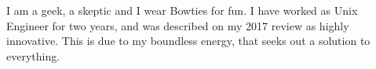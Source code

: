 

\begin{cvparagraph}
I am a geek, a skeptic and I wear Bowties for fun.
I have worked as Unix Engineer for two years, and was described on my 2017 review as  highly innovative.
This is due to my boundless energy, that seeks out a solution to everything.



\end{cvparagraph}




